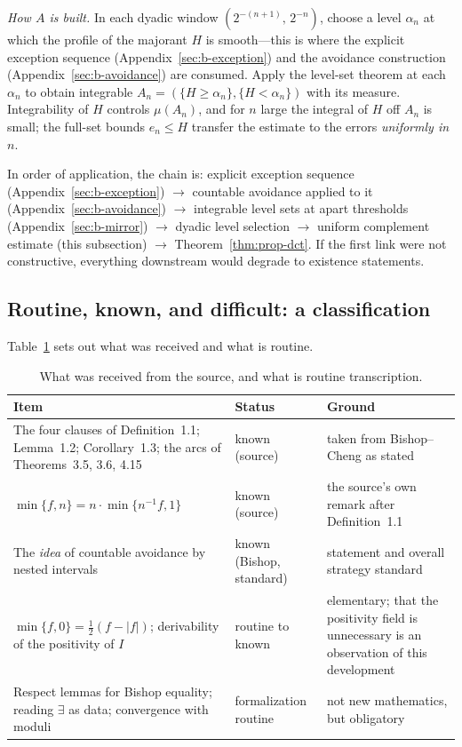 \documentclass[11pt]{article}
\theoremstyle{definition}
\theoremstyle{remark}
\begin{document}
\emph{How $A$ is built.}  In each dyadic window $(2^{-(n+1)},\,2^{-n})$, choose a level $\alpha_n$ at which the profile of the majorant $H$ is smooth---this is where the explicit exception sequence (Appendix~\ref{sec:b-exception}) and the avoidance construction (Appendix~\ref{sec:b-avoidance}) are consumed.  Apply the level-set theorem at each $\alpha_n$ to obtain integrable
\(
A_n=(\{H\ge\alpha_n\},\{H<\alpha_n\})
\)
with its measure.  Integrability of $H$ controls $\mu(A_n)$, and for $n$ large the integral of $H$ off $A_n$ is small; the full-set bounds $e_n\le H$ transfer the estimate to the errors \emph{uniformly in $n$}.

In order of application, the chain is: explicit exception sequence (Appendix~\ref{sec:b-exception}) $\to$ countable avoidance applied to it (Appendix~\ref{sec:b-avoidance}) $\to$ integrable level sets at apart thresholds (Appendix~\ref{sec:b-mirror}) $\to$ dyadic level selection $\to$ uniform complement estimate (this subsection) $\to$ Theorem~\ref{thm:prop-dct}.  If the first link were not constructive, everything downstream would degrade to existence statements.

\subsection{Routine, known, and difficult: a classification}
\label{sec:b-triage}

Table~\ref{tab:received} sets out what was received and what is routine.

\begin{table}[htbp]
\centering\small
\caption{What was received from the source, and what is routine transcription.}
\label{tab:received}
\setlength{\tabcolsep}{3pt}
\begin{tabular}{p{}p{}p{}}
\hline
Item & Status & Ground \\
\hline
The four clauses of Definition~1.1; Lemma~1.2; Corollary~1.3; the arcs of Theorems~3.5, 3.6, 4.15 & known (source) & taken from Bishop--Cheng as stated \\
$\min\{f,n\}=n\cdot\min\{n^{-1}f,1\}$ & known (source) & the source's own remark after Definition~1.1 \\
The \emph{idea} of countable avoidance by nested intervals & known (Bishop, standard) & statement and overall strategy standard \\
$\min\{f,0\}=\tfrac12(f-|f|)$; derivability of the positivity of $I$ & routine to known & elementary; that the positivity field is unnecessary is an observation of this development \\
Respect lemmas for Bishop equality; reading $\exists$ as data; convergence with moduli & formalization routine & not new mathematics, but obligatory \\
\hline
\end{tabular}
\end{table}
\end{document}
